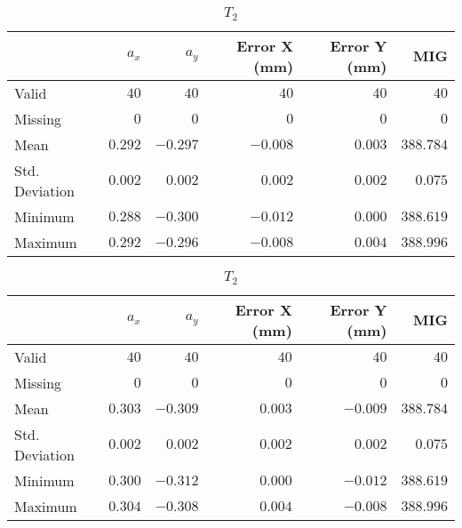 \begin{table}[h]
    \centering
    \begin{subtable}{\textwidth}
        \centering
        \footnotesize
        \begin{tabular}{lrrrrr}
            \toprule
                & $a_x$ & $a_y$ & Error X (mm) & Error Y (mm) & MIG  \\
            \midrule
			Valid & $40$ & $40$ & $40$ & $40$ & $40$  \\
			Missing & $0$ & $0$ & $0$ & $0$ & $0$  \\
			Mean & $0.292$ & $-0.297$ & $-0.008$ & $0.003$ & $388.784$  \\
			Std. Deviation & $0.002$ & $0.002$ & $0.002$ & $0.002$ & $0.075$  \\
			Minimum & $0.288$ & $-0.300$ & $-0.012$ & $0.000$ & $388.619$  \\
			Maximum & $0.292$ & $-0.296$ & $-0.008$ & $0.004$ & $388.996$  \\
            \bottomrule
        \end{tabular}
        \caption{$T_1$}
    \end{subtable}
    
    \vspace{10pt} %
    
    \begin{subtable}{\textwidth}
        \centering
        \footnotesize
        \begin{tabular}{lrrrrr}
            \toprule
                & $a_x$ & $a_y$ & Error X (mm) & Error Y (mm) & MIG  \\
            \midrule
			Valid & $40$ & $40$ & $40$ & $40$ & $40$  \\
			Missing & $0$ & $0$ & $0$ & $0$ & $0$  \\
			Mean & $0.303$ & $-0.309$ & $0.003$ & $-0.009$ & $388.784$  \\
			Std. Deviation & $0.002$ & $0.002$ & $0.002$ & $0.002$ & $0.075$  \\
			Minimum & $0.300$ & $-0.312$ & $0.000$ & $-0.012$ & $388.619$  \\
			Maximum & $0.304$ & $-0.308$ & $0.004$ & $-0.008$ & $388.996$  \\
            \bottomrule
        \end{tabular}
        \caption{$T_2$}
    \end{subtable}

    \vspace{10pt} %
    

\end{table}
